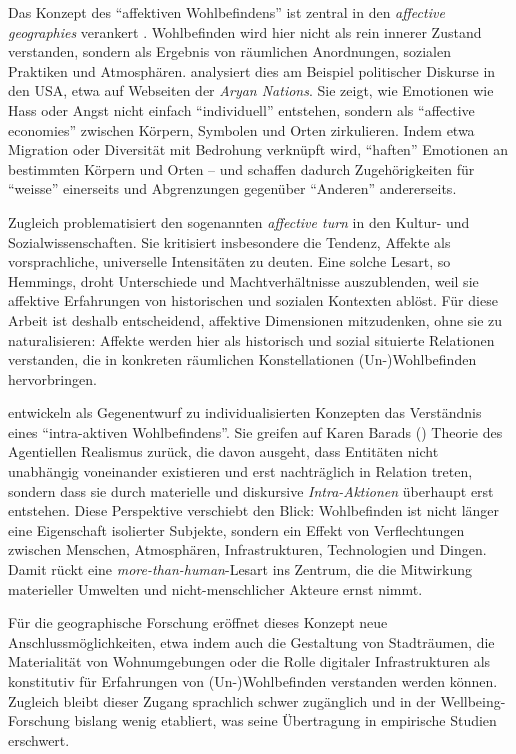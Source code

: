 Das Konzept des \enquote{affektiven Wohlbefindens} ist zentral in den \emph{affective geographies} verankert \parencite{hoSocialGeographyIII2024}. Wohlbefinden wird hier nicht als rein innerer Zustand verstanden, sondern als Ergebnis von räumlichen Anordnungen, sozialen Praktiken und Atmosphären. \textcite{ahmedAffectiveEconomies2004} analysiert dies am Beispiel politischer Diskurse in den USA, etwa auf Webseiten der \emph{Aryan Nations}. Sie zeigt, wie Emotionen wie Hass oder Angst nicht einfach \enquote{individuell} entstehen, sondern als \enquote{affective economies} zwischen Körpern, Symbolen und Orten zirkulieren. Indem etwa Migration oder Diversität mit Bedrohung verknüpft wird, \enquote{haften} Emotionen an bestimmten Körpern und Orten -- und schaffen dadurch Zugehörigkeiten für \enquote{weisse} einerseits und Abgrenzungen gegenüber \enquote{Anderen} andererseits.

Zugleich problematisiert \textcite{hemmingsInvokingAffectCultural2005} den sogenannten \emph{affective turn} in den Kultur- und Sozialwissenschaften. Sie kritisiert insbesondere die Tendenz, Affekte als vorsprachliche, universelle Intensitäten zu deuten. Eine solche Lesart, so Hemmings, droht Unterschiede und Machtverhältnisse auszublenden, weil sie affektive Erfahrungen von historischen und sozialen Kontexten ablöst. Für diese Arbeit ist deshalb entscheidend, affektive Dimensionen mitzudenken, ohne sie zu naturalisieren: Affekte werden hier als historisch und sozial situierte Relationen verstanden, die in konkreten räumlichen Konstellationen (Un-)Wohlbefinden hervorbringen.

\textcite{smithWhichBeingWellbeing2018} entwickeln als Gegenentwurf zu individualisierten Konzepten das Verständnis eines \enquote{intra-aktiven Wohlbefindens}. Sie greifen auf Karen Barads (\citeyear{baradMeetingUniverseHalfway2007}) Theorie des Agentiellen Realismus zurück, die davon ausgeht, dass Entitäten nicht unabhängig voneinander existieren und erst nachträglich in Relation treten, sondern dass sie durch materielle und diskursive \emph{Intra-Aktionen} überhaupt erst entstehen. Diese Perspektive verschiebt den Blick: Wohlbefinden ist nicht länger eine Eigenschaft isolierter Subjekte, sondern ein Effekt von Verflechtungen zwischen Menschen, Atmosphären, Infrastrukturen, Technologien und Dingen. Damit rückt eine \emph{more-than-human}-Lesart ins Zentrum, die die Mitwirkung materieller Umwelten und nicht-menschlicher Akteure ernst nimmt. 

Für die geographische Forschung eröffnet dieses Konzept neue Anschlussmöglichkeiten, etwa indem auch die Gestaltung von Stadträumen, die Materialität von Wohnumgebungen oder die Rolle digitaler Infrastrukturen als konstitutiv für Erfahrungen von (Un-)Wohlbefinden verstanden werden können. Zugleich bleibt dieser Zugang sprachlich schwer zugänglich und in der Wellbeing-Forschung bislang wenig etabliert, was seine Übertragung in empirische Studien erschwert.

